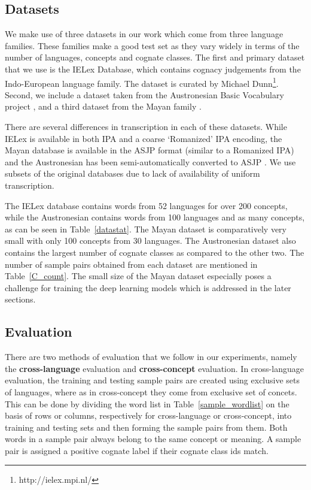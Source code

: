\documentclass[11pt,letterpaper]{article}
\begin{document}
\subsection{Datasets}

We make use of three datasets in our work which come from three language families. These families make a good test set as they vary widely in terms of the number of languages, concepts and cognate classes. The first and primary dataset that we use is the IELex Database, which contains cognacy judgements from the Indo-European language family. The dataset is curated by Michael Dunn\footnote{http://ielex.mpi.nl/}. Second, we include a dataset taken from the Austronesian Basic Vocabulary project \cite{greenhillBlust:08}, and a third dataset from the Mayan family \cite{wichmann:2008}. 

There are several differences in transcription in each of these datasets. While IELex is available in both IPA and a coarse `Romanized' IPA encoding, the Mayan database is available in the ASJP format (similar to a Romanized IPA) \cite{Brown:08} and the Austronesian has been semi-automatically converted to ASJP \cite{rama2016siamese}. We use subsets of the original databases due to lack of availability of uniform transcription.

The IELex database contains words from 52 languages for over 200 concepts, while the Austronesian contains words from 100 languages and as many concepts, as can be seen in Table~\ref{datastat}. The Mayan dataset is comparatively very small with only 100 concepts from 30 languages. The Austronesian dataset also contains the largest number of cognate classes as compared to the other two. The number of sample pairs obtained from each dataset are mentioned in Table~\ref{C_count}. The small size of the Mayan dataset especially poses a challenge for training the deep learning models which is addressed in the later sections. 


\subsection{Evaluation}

There are two methods of evaluation that we follow in our experiments, namely the \textbf{cross-language} evaluation and \textbf{cross-concept} evaluation. In cross-language evaluation, the training and testing sample pairs are created using exclusive sets of languages, where as in cross-concept they come from exclusive set of concets. This can be done by dividing the word list in Table~\ref{sample_wordlist} on the basis of rows or columns, respectively for cross-language or cross-concept, into training and testing sets and then forming the sample pairs from them. Both words in a sample pair always belong to the same concept or meaning. A sample pair is assigned a positive cognate label if their cognate class ids match. 
\end{document}
